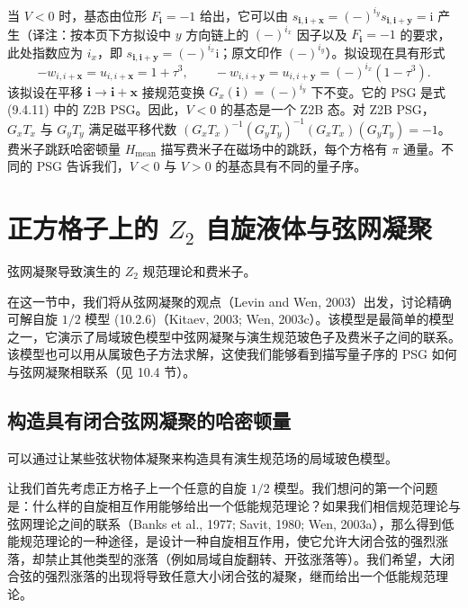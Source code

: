 当 $V<0$ 时，基态由位形 $F_{\pmb{i}}=-1$ 给出，它可以由 $s_{\pmb{i},\pmb{i}+\pmb{x}}=(-)^{i_y}s_{\pmb{i},\pmb{i}+\pmb{y}}=\mathrm{i}$ 产生（译注：按本页下方拟设中 $y$ 方向链上的 $(-)^{i_x}$ 因子以及 $F_{\pmb{i}}=-1$ 的要求，此处指数应为 $i_x$，即 $s_{\pmb{i},\pmb{i}+\pmb{y}}=(-)^{i_x}\mathrm{i}$；原文印作 $(-)^{i_y}$）。拟设现在具有形式
\begin{equation*}
-w_{i,i+\pmb{x}}=u_{i,i+\pmb{x}}=1+\tau^{3},\qquad
-w_{i,i+\pmb{y}}=u_{i,i+\pmb{y}}=(-)^{i_x}(1-\tau^{3}).
\end{equation*}
该拟设在平移 $\pmb{i}\to\pmb{i}+\pmb{x}$ 接规范变换 $G_x(\pmb{i})=(-)^{i_y}$ 下不变。它的 PSG 是式 (9.4.11) 中的 Z2B PSG。因此，$V<0$ 的基态是一个 Z2B 态。对 Z2B PSG，$G_xT_x$ 与 $G_yT_y$ 满足磁平移代数 $(G_xT_x)^{-1}(G_yT_y)^{-1}(G_xT_x)(G_yT_y)=-1$。费米子跳跃哈密顿量 $H_{\text{mean}}$ 描写费米子在磁场中的跳跃，每个方格有 $\pi$ 通量。不同的 PSG 告诉我们，$V<0$ 与 $V>0$ 的基态具有不同的量子序。

\section{正方格子上的 $Z_2$ 自旋液体与弦网凝聚}

\begin{keypoints}
\item 弦网凝聚导致演生的 $Z_2$ 规范理论和费米子。
\end{keypoints}

在这一节中，我们将从弦网凝聚的观点（Levin and Wen, 2003）出发，讨论精确可解自旋 $1/2$ 模型 (10.2.6)（Kitaev, 2003; Wen, 2003c）。该模型是最简单的模型之一，它演示了局域玻色模型中弦网凝聚与演生规范玻色子及费米子之间的联系。该模型也可以用从属玻色子方法求解，这使我们能够看到描写量子序的 PSG 如何与弦网凝聚相联系（见 10.4 节）。

\subsection{构造具有闭合弦网凝聚的哈密顿量}

\begin{keypoints}
\item 可以通过让某些弦状物体凝聚来构造具有演生规范场的局域玻色模型。
\end{keypoints}

让我们首先考虑正方格子上一个任意的自旋 $1/2$ 模型。我们想问的第一个问题是：什么样的自旋相互作用能够给出一个低能规范理论？如果我们相信规范理论与弦网理论之间的联系（Banks et al., 1977; Savit, 1980; Wen, 2003a），那么得到低能规范理论的一种途径，是设计一种自旋相互作用，使它允许大闭合弦的强烈涨落，却禁止其他类型的涨落（例如局域自旋翻转、开弦涨落等）。我们希望，大闭合弦的强烈涨落的出现将导致任意大小闭合弦的凝聚，继而给出一个低能规范理论。

